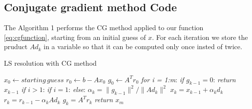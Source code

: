 \documentclass{article}
\begin{document}
\subsection{Conjugate gradient method Code}
The Algorithm 1 performs the CG method applied to our function \eqref{eq:cgfunction}, starting from an initial guess of $x$. For each iteration we store the pruduct $Ad_k$ in a variable so that it can be computed only once insted of twice.
\makeatletter
\makeatother
\begin{algorithm}
\caption{LS resolution with CG method}
\begin{algorithmic}[1]
\State $x_0 \gets starting\,guess$
\State $r_0 \gets b -  Ax_0$
\State $g_0 \gets A^{T}r_0$ 
\State \emph{for i = 1:m}:
\State \quad\emph{if $g_{k-1} = 0$}:
\State\quad\quad\textit{return $x_{k-1}$}
\State \quad\emph{if $i > 1$}:
\State\quad{}
\State \quad\emph{if $i = 1$}: 
\State\quad{}
\State \quad\emph{else}: 
\State\quad{}
\State\quad $\alpha_{k} = \|g_{k-1}\|^2 / \|Ad_{k}\|^2$
\State\quad $x_{k} = x_{k-1} + \alpha_{k}d_{k}$
\State\quad $r_{k} = r_{k-1} - \alpha_{k}Ad_{k}$
\State\quad $g_{k} = A^{T}r_{k}$
\State\textit{return $x_{m}$}
\EndFunction
\end{algorithmic}
\end{algorithm}
\end{document}
